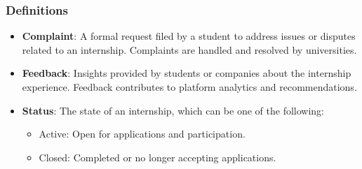 \renewcommand{\arraystretch}{1.5}
\subsubsection{Definitions}

\begin{itemize}
    \item \textbf{Complaint}: A formal request filed by a student to address issues or disputes related to an internship. Complaints are handled and resolved by universities.
    \item \textbf{Feedback}: Insights provided by students or companies about the internship experience. Feedback contributes to platform analytics and recommendations.
    \item \textbf{Status}: The state of an internship, which can be one of the following: 
        \begin{itemize}
            \item Active: Open for applications and participation.
            \item Closed: Completed or no longer accepting applications.

\end{itemize}
\end{itemize}
